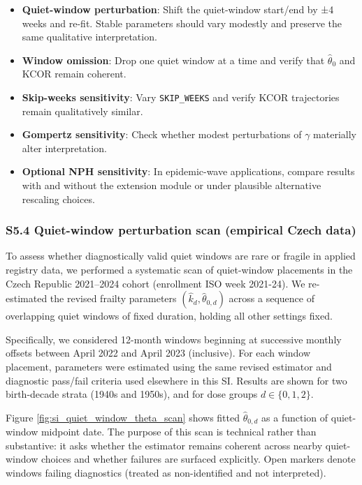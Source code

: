 \documentclass[
]{article}
\providecommand{\tightlist}{%
  \setlength{\itemsep}{0pt}\setlength{\parskip}{0pt}}
\begin{document}
\begin{itemize}
\tightlist
\item
  \textbf{Quiet-window perturbation}: Shift the quiet-window start/end
  by ±4 weeks and re-fit. Stable parameters should vary modestly and
  preserve the same qualitative interpretation.
\item
  \textbf{Window omission}: Drop one quiet window at a time and verify
  that \(\hat{\theta}_0\) and KCOR remain coherent.
\item
  \textbf{Skip-weeks sensitivity}: Vary \texttt{SKIP\_WEEKS} and verify
  KCOR trajectories remain qualitatively similar.
\item
  \textbf{Gompertz sensitivity}: Check whether modest perturbations of
  \(\gamma\) materially alter interpretation.
\item
  \textbf{Optional NPH sensitivity}: In epidemic-wave applications,
  compare results with and without the extension module or under
  plausible alternative rescaling choices.
\end{itemize}

\subsubsection{S5.4 Quiet-window perturbation scan (empirical Czech
data)}\label{s5.4-quiet-window-perturbation-scan-empirical-czech-data}

To assess whether diagnostically valid quiet windows are rare or fragile
in applied registry data, we performed a systematic scan of quiet-window
placements in the Czech Republic 2021--2024 cohort (enrollment ISO week
2021-24). We re-estimated the revised frailty parameters
\((\hat{k}_d,\hat{\theta}_{0,d})\) across a sequence of overlapping
quiet windows of fixed duration, holding all other settings fixed.

Specifically, we considered 12-month windows beginning at successive
monthly offsets between April 2022 and April 2023 (inclusive). For each
window placement, parameters were estimated using the same revised
estimator and diagnostic pass/fail criteria used elsewhere in this SI.
Results are shown for two birth-decade strata (1940s and 1950s), and for
dose groups \(d \in \{0,1,2\}\).

Figure \ref{fig:si_quiet_window_theta_scan} shows fitted
\(\hat{\theta}_{0,d}\) as a function of quiet-window midpoint date. The
purpose of this scan is technical rather than substantive: it asks
whether the estimator remains coherent across nearby quiet-window
choices and whether failures are surfaced explicitly. Open markers
denote windows failing diagnostics (treated as non-identified and not
interpreted).
\end{document}

